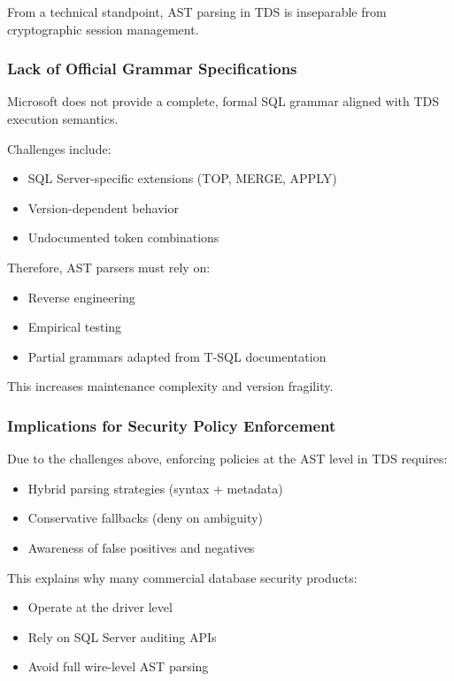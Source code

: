 From a technical standpoint, AST parsing in TDS is inseparable from cryptographic session management.

\subsubsection{Lack of Official Grammar Specifications}

Microsoft does not provide a complete, formal SQL grammar aligned with TDS execution semantics.

Challenges include:
\begin{itemize}
    \item SQL Server-specific extensions (TOP, MERGE, APPLY)
    \item Version-dependent behavior
    \item Undocumented token combinations
\end{itemize}

Therefore, AST parsers must rely on:
\begin{itemize}
    \item Reverse engineering
    \item Empirical testing
    \item Partial grammars adapted from T-SQL documentation
\end{itemize}

This increases maintenance complexity and version fragility.

\subsubsection{Implications for Security Policy Enforcement}

Due to the challenges above, enforcing policies at the AST level in TDS requires:

\begin{itemize}
    \item Hybrid parsing strategies (syntax + metadata)
    \item Conservative fallbacks (deny on ambiguity)
    \item Awareness of false positives and negatives
\end{itemize}

This explains why many commercial database security products:
\begin{itemize}
    \item Operate at the driver level
    \item Rely on SQL Server auditing APIs
    \item Avoid full wire-level AST parsing
\end{itemize}

